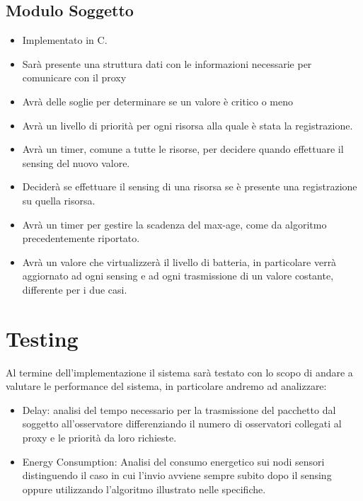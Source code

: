     \subsection{Modulo Soggetto}

      \begin{itemize}
        \item Implementato in C.
        \item Sarà presente una struttura dati con le informazioni necessarie per comunicare con il proxy
        \item Avrà delle soglie per determinare se un valore è critico o meno
        \item Avrà un livello di priorità per ogni risorsa alla quale è stata la registrazione.
        \item Avrà un timer, comune a tutte le risorse, per decidere quando effettuare il sensing del nuovo valore.
        \item Deciderà se effettuare il sensing di una risorsa se è presente una registrazione su quella risorsa.
        \item Avrà un timer per gestire la scadenza del max-age, come da algoritmo precedentemente riportato.
        \item Avrà un valore che virtualizzerà il livello di batteria, in particolare verrà aggiornato ad ogni sensing e ad ogni trasmissione di un valore costante, differente per i due casi.
      \end{itemize}

	\section{Testing}
		Al termine dell'implementazione il sistema sarà testato con lo scopo di andare a valutare le performance del sistema, in particolare andremo ad analizzare:
			\begin{itemize}
				\item Delay: analisi del tempo necessario per la trasmissione del pacchetto dal soggetto all’osservatore differenziando il numero di osservatori collegati al proxy e le priorità da loro richieste.
				\item Energy Consumption: Analisi del consumo energetico sui nodi sensori distinguendo il caso in cui l'invio avviene sempre subito dopo il sensing oppure utilizzando l'algoritmo illustrato nelle specifiche.
			\end{itemize}
